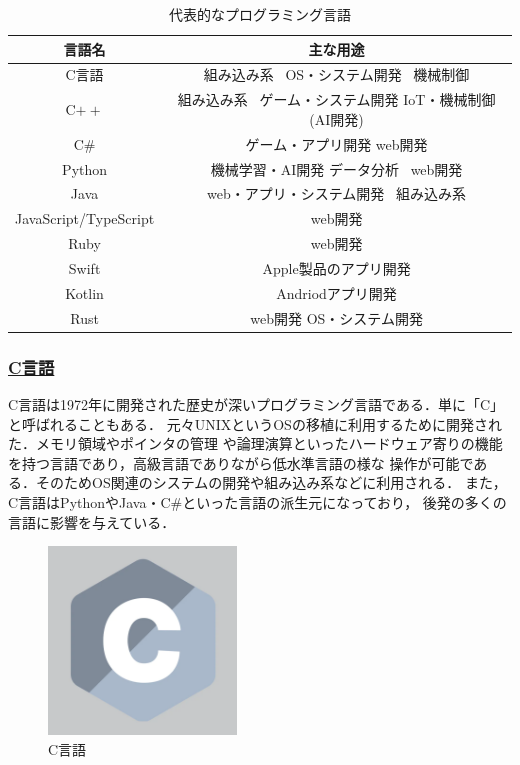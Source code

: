 \documentclass[autodetect-engine,dvi=dvipdfmx,ja=standard,a4j]{bxjsarticle}
\begin{document}
\begin{table}[H]
    \centering
    \begin{tabular}{|c|c|}
        \hline
        \textbf{言語名} & \textbf{主な用途} \\
        \hline
        C言語 & 組み込み系 \ OS・システム開発 \ 機械制御\\ \hline
        C$++$ & 組み込み系 \ ゲーム・システム開発 IoT・機械制御 (AI開発)\\ \hline
        C\# & ゲーム・アプリ開発 web開発 \\ \hline
        Python & 機械学習・AI開発 データ分析 \ web開発 \\ \hline
        Java & web・アプリ・システム開発 \ 組み込み系 \\ \hline
        JavaScript/TypeScript & web開発 \\ \hline
        Ruby & web開発 \\ \hline
        Swift & Apple製品のアプリ開発 \\ \hline
        Kotlin & Andriodアプリ開発 \\ \hline
        Rust & web開発 OS・システム開発 \\
        \hline
    \end{tabular}
    \caption{代表的なプログラミング言語}
    \label{tab:program-lang}
\end{table}

\subsubsection*{\underline{\textbf{C言語}}}
C言語は1972年に開発された歴史が深いプログラミング言語である．単に「C」と呼ばれることもある．
元々UNIXというOSの移植に利用するために開発された．メモリ領域やポインタの管理
や論理演算といったハードウェア寄りの機能を持つ言語であり，高級言語でありながら低水準言語の様な
操作が可能である．そのためOS関連のシステムの開発や組み込み系などに利用される．
また，C言語はPythonやJava・C\#といった言語の派生元になっており，
後発の多くの言語に影響を与えている．
\begin{figure}[H]
    \centering
    \includegraphics[width=50mm]{image/C.png}
    \caption*{C言語}
    \label{fig:C}
\end{figure}
\end{document}
